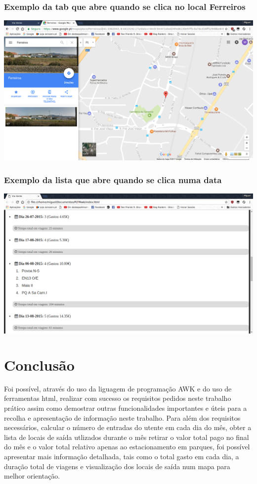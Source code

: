 \documentclass{report}
\begin{document}
\subsection{Exemplo da tab que abre quando se clica no local Ferreiros}

\includegraphics[scale=0.35]{maps.png}\par

\subsection{Exemplo da lista que abre quando se clica numa data}

\includegraphics[scale=0.35]{out5.png}\par

\chapter{Conclusão} \label{concl}
Foi possível, 
através do uso da liguagem de programação AWK e do uso de ferramentas html, realizar com sucesso os 
requisitos pedidos neste trabalho prático assim como demostrar outras funcionalidades importantes e úteis para a 
recolha e apresentação de informação neste trabalho.
Para além dos requisitos necessários, calcular o número de entradas do utente em cada dia do mês, obter a 
lista de locais de saída utlizados durante o mês
retirar o valor total pago no final do mês e o valor total relativo apenas ao estacionamento em parques, 
foi possível apresentar mais informação detalhada, tais como
o total gasto em cada dia, a duração total de viagens e visualização dos locais de saída num mapa para melhor orientação.\par
\end{document}
